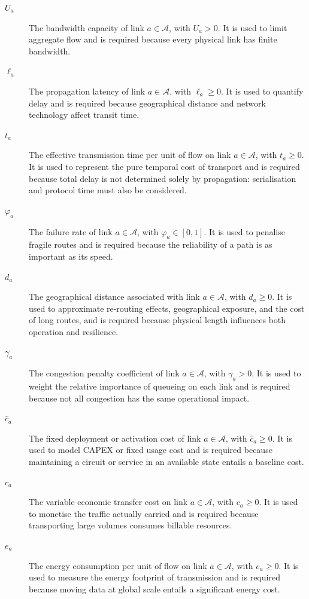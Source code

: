 \documentclass[a4paper,fleqn]{cas-dc}
\newcommand{\A}{\mathcal{A}}
\begin{document}
\begin{description}
\item[\(U_a\)] The bandwidth capacity of link \(a\in\A\), with \(U_a>0\). It is used to limit aggregate flow and is required because every physical link has finite bandwidth. 

\item[\(\ell_a\)] The propagation latency of link \(a\in\A\), with \(\ell_a\ge 0\). It is used to quantify delay and is required because geographical distance and network technology affect transit time. 

\item[\(t_a\)] The effective transmission time per unit of flow on link \(a\in\A\), with \(t_a\ge 0\). It is used to represent the pure temporal cost of transport and is required because total delay is not determined solely by propagation: serialisation and protocol time must also be considered. 

\item[\(\varphi_a\)] The failure rate of link \(a\in\A\), with \(\varphi_a\in[0,1]\). It is used to penalise fragile routes and is required because the reliability of a path is as important as its speed. 

\item[\(d_a\)] The geographical distance associated with link  \(a\in\A\), with \(d_a\ge 0\). It is used to approximate re-routing effects, geographical exposure, and the cost of long routes, and is required because physical length influences both operation and resilience. 

\item[\(\gamma_a\)] The congestion penalty coefficient of link \(a\in\A\), with \(\gamma_a>0\). It is used to weight the relative importance of queueing on each link and is required because not all congestion has the same operational impact. 

\item[\(\hat c_a\)] The fixed deployment or activation cost of link \(a\in\A\), with \(\hat c_a\ge 0\). It is used to model CAPEX or fixed usage cost and is required because maintaining a circuit or service in an available state entails a baseline cost. 

\item[\(c_a\)] The variable economic transfer cost on link \(a\in\A\), with \(c_a\ge 0\). It is used to monetise the traffic actually carried and is required because transporting large volumes consumes billable resources. 

\item[\(e_a\)] The energy consumption per unit of flow on link \(a\in\A\), with \(e_a\ge 0\). It is used to measure the energy footprint of transmission and is required because moving data at global scale entails a significant energy cost. 


\end{description}
\end{document}

